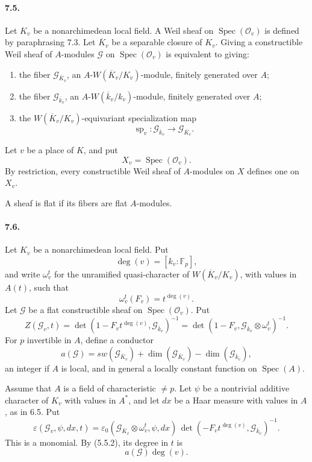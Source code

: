 \documentclass[10pt,letterpaper]{article}
\newcommand{\F}{\mathbb F}
\newcommand{\Spec}{\operatorname{Spec}}
\providecommand{\spc}{\operatorname{sp}}
\providecommand{\Spec}{\operatorname{Spec}}
\providecommand{\spc}{\operatorname{sp}}
\providecommand{\Spec}{\operatorname{Spec}}
\providecommand{\Spec}{\operatorname{Spec}}
\providecommand{\spc}{\operatorname{sp}}
\begin{document}
\paragraph{7.5.} Let \(K_v\) be a nonarchimedean local field. A Weil sheaf on \(\Spec(\mathcal O_v)\) is defined by paraphrasing 7.3. Let \(\overline K_v\) be a separable closure of \(K_v\). Giving a constructible Weil sheaf of \(A\)-modules \(\mathcal G\) on \(\Spec(\mathcal O_v)\) is equivalent to giving:
\begin{enumerate}[label=\alph*)]
\item the fiber \(\mathcal G_{\overline K_v}\), an \(A\)-\(W(\overline K_v/K_v)\)-module, finitely generated over \(A\);
\item the fiber \(\mathcal G_{\overline k_v}\), an \(A\)-\(W(\overline k_v/k_v)\)-module, finitely generated over \(A\);
\item the \(W(\overline K_v/K_v)\)-equivariant specialization map
\[
\spc_v:\mathcal G_{\overline k_v}\longrightarrow\mathcal G_{\overline K_v}.
\]
\end{enumerate}
Let \(v\) be a place of \(K\), and put
\[
X_v=\Spec(\mathcal O_v).
\]
By restriction, every constructible Weil sheaf of \(A\)-modules on \(X\) defines one on \(X_v\).

A sheaf is flat if its fibers are flat \(A\)-modules.

\paragraph{7.6.} Let \(K_v\) be a nonarchimedean local field. Put
\[
\deg(v)=[k_v:\F_p],
\]
and write \(\omega_v^t\) for the unramified quasi-character of \(W(\overline K_v/K_v)\), with values in \(A(t)\), such that
\[
\omega_v^t(F_v)=t^{\deg(v)}.
\]
Let \(\mathcal G\) be a flat constructible sheaf on \(\Spec(\mathcal O_v)\). Put
\[
\tag{7.6.1}
Z(\mathcal G_v,t)
=
\det(1-F_vt^{\deg(v)},\mathcal G_{\overline k_v})^{-1}
=
\det(1-F_v,\mathcal G_{\overline k_v}\otimes\omega_v^t)^{-1}.
\]
For \(p\) invertible in \(A\), define a conductor
\[
\tag{7.6.2}
a(\mathcal G)=sw(\mathcal G_{\overline K_v})+
\dim(\mathcal G_{\overline K_v})-\dim(\mathcal G_{\overline k_v}),
\]
an integer if \(A\) is local, and in general a locally constant function on \(\Spec(A)\).

Assume that \(A\) is a field of characteristic \(\ne p\). Let \(\psi\) be a nontrivial additive character of \(K_v\) with values in \(A^*\), and let \(dx\) be a Haar measure with values in \(A\), as in 6.5. Put
\[
\tag{7.6.3}
\varepsilon(\mathcal G_v,\psi,dx,t)
=
\varepsilon_0(\mathcal G_{\overline K_v}\otimes\omega_v^t,\psi,dx)\,
\det(-F_vt^{\deg(v)},\mathcal G_{\overline k_v})^{-1}.
\]
This is a monomial. By (5.5.2), its degree in \(t\) is
\[
a(\mathcal G)\deg(v).
\]
\end{document}
